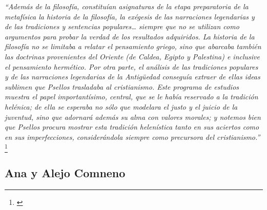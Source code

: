 \textit{“Además de la filosofía, constituían asignaturas de la etapa 
preparatoria de la metafísica la historia de la filosofía, 
la exégesis de las narraciones legendarias y de las tradiciones 
y sentencias populares… siempre que no se utilizan como argumentos 
para probar la verdad de los resultados adquiridos. 
La historia de la filosofía no se limitaba  a relatar el pensamiento 
griego, sino que abarcaba también las doctrinas provenientes del 
Oriente (de Caldea, Egipto y Palestina) e inclusive el pensamiento 
hermético. 
Por otra parte, el análisis de las tradiciones populares y de las 
narraciones legendarias de la Antigüedad conseguía extraer de ellas 
ideas sublimen que Psellos trasladaba al cristianismo. 
Este programa de estudios muestra el papel importantísimo, central, 
que se le había reservado a la tradición helénica; 
de ella se esperaba no sólo que modelara el justo y el juicio de la 
juventud, sino que adornará además su alma con valores morales; 
y notemos bien que Psellos procura mostrar esta tradición helenística 
tanto en sus aciertos como en sus imperfecciones, 
considerándola siempre como precursora del cristianismo.”}
\footnote{\cite[p.~165]{filosofia}}

\subsection{Ana y Alejo Comneno}



